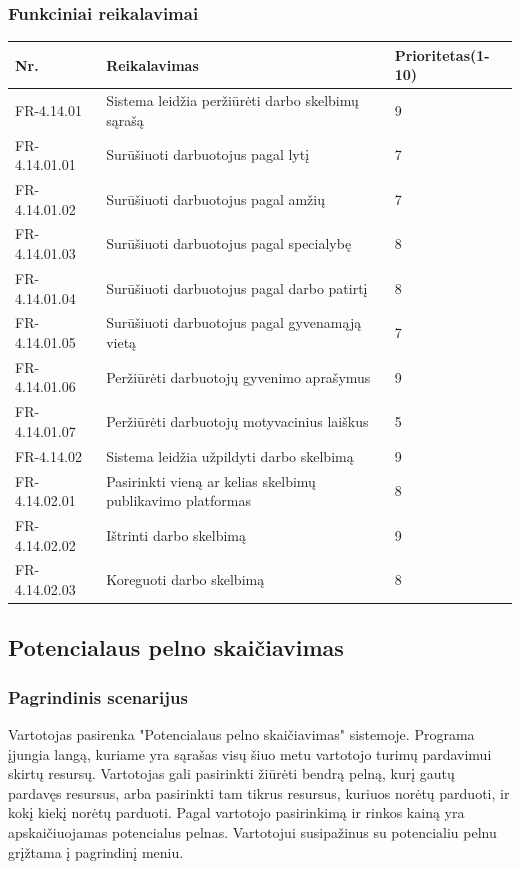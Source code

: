 \documentclass[oneside]{VUMIFPSkursinis}
\begin{document}
	\subsubsection{Funkciniai reikalavimai}
\begin{table}[htbp]
	\begin{tabularx}{1\textwidth}{ |P{2.5cm}|X|P{3cm }| }  \hline
		Nr. & Reikalavimas & Prioritetas(1-10) \\ \hline
		FR-4.14.01 & Sistema leidžia peržiūrėti darbo skelbimų sąrašą & 9 \\ \hline
		FR-4.14.01.01 & Surūšiuoti darbuotojus pagal lytį & 7 \\ \hline
		FR-4.14.01.02 & Surūšiuoti darbuotojus pagal amžių & 7 \\ \hline
		FR-4.14.01.03 & Surūšiuoti darbuotojus pagal specialybę & 8  \\ \hline
		FR-4.14.01.04 & Surūšiuoti darbuotojus pagal darbo patirtį & 8 \\ \hline
		FR-4.14.01.05 & Surūšiuoti darbuotojus pagal gyvenamąją vietą & 7 \\ \hline
		FR-4.14.01.06 & Peržiūrėti darbuotojų gyvenimo aprašymus & 9 \\ \hline
		FR-4.14.01.07 & Peržiūrėti darbuotojų motyvacinius laiškus & 5 \\ \hline
		FR-4.14.02 & Sistema leidžia užpildyti darbo skelbimą & 9 \\ \hline
		FR-4.14.02.01 & Pasirinkti vieną ar kelias skelbimų publikavimo platformas & 8 \\ \hline
		FR-4.14.02.02 & Ištrinti darbo skelbimą & 9 \\ \hline
		FR-4.14.02.03 & Koreguoti darbo skelbimą & 8 \\ \hline
	\end{tabularx}
\end{table}	

\subsection{Potencialaus pelno skaičiavimas}
	\subsubsection{Pagrindinis scenarijus}
	Vartotojas pasirenka "Potencialaus pelno skaičiavimas" sistemoje. Programa įjungia langą, kuriame yra sąrašas visų šiuo metu vartotojo turimų pardavimui skirtų resursų. Vartotojas gali pasirinkti žiūrėti bendrą pelną, kurį gautų pardavęs resursus, arba pasirinkti tam tikrus resursus, kuriuos norėtų parduoti, ir kokį kiekį norėtų parduoti. Pagal vartotojo pasirinkimą ir rinkos kainą yra apskaičiuojamas potencialus pelnas. Vartotojui susipažinus su potencialiu pelnu grįžtama į pagrindinį meniu.
\end{document}
